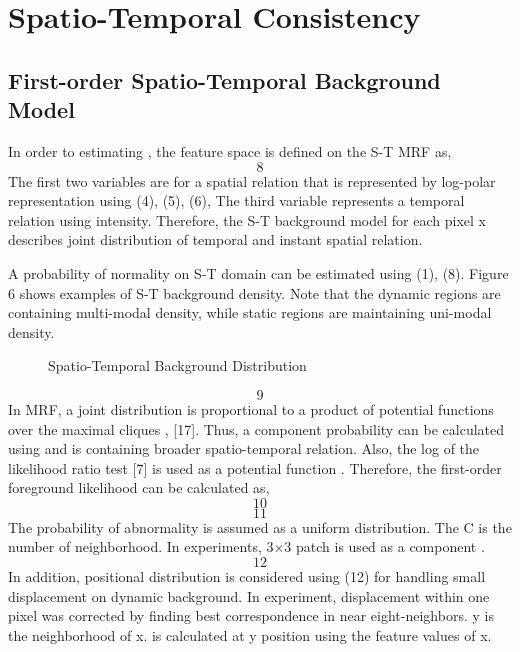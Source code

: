 \documentclass[conference]{IEEEtran}
\begin{document}
\section{Spatio-Temporal Consistency}

\subsection{First-order Spatio-Temporal Background Model}
In order to estimating  , the feature space is defined on the S-T MRF as,
\begin{equation}
  8
\end{equation}
The first two variables are for a spatial relation that is represented by log-polar representation using (4), (5), (6), The third variable represents a temporal relation using intensity. Therefore, the S-T background model for each pixel x describes joint distribution of temporal and instant spatial relation. 

A probability of normality   on S-T domain can be estimated using (1), (8). Figure 6 shows examples of S-T background density. Note that the dynamic regions are containing multi-modal density, while static regions are maintaining uni-modal density.

\begin{figure}[!t]
  \centering
  \label{fig:60}
  \caption{Spatio-Temporal Background Distribution}
\end{figure}

\begin{equation}
  9
\end{equation}
In MRF, a joint distribution   is proportional to a product of potential functions   over the maximal cliques  , [17]. Thus, a component probability   can be calculated using   and is containing broader spatio-temporal relation. Also, the log of the likelihood ratio test [7] is used as a potential function  . Therefore, the first-order foreground likelihood   can be calculated as,
\begin{equation}
  10
\end{equation}
\begin{equation}
  11
\end{equation}
The probability of abnormality   is assumed as a uniform distribution. The C is the number of neighborhood. In experiments, 3×3 patch is used as a component  . 
\begin{equation}
  12
\end{equation}
In addition, positional distribution is considered using (12) for handling small displacement on dynamic background. In experiment, displacement within one pixel was corrected by finding best correspondence in near eight-neighbors. y is the neighborhood of x.   is calculated at y position using the feature values of x.
\end{document}

